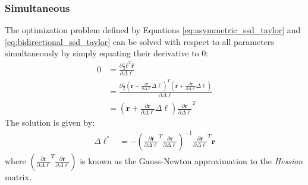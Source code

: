 \subsubsection*{Simultaneous}
\label{sec:gauss_newton_simultaneous}

The optimization problem defined by Equations \ref{eq:asymmetric_ssd_taylor}  and \ref{eq:bidirectional_ssd_taylor} can be solved with respect to all parameters simultaneously by simply equating their derivative to $0$:
\begin{equation}
    \begin{aligned}
		0 & = \frac{\partial\frac{1}{2}\hat{\mathbf{r}}^T \hat{\mathbf{r}}}{\partial \Delta \boldsymbol{\ell}}
		\\
		& = \frac{\partial\frac{1}{2}(\mathbf{r} + \frac{\partial \mathbf{r}}{\partial \Delta \boldsymbol{\ell}} \Delta \boldsymbol{\ell})^T(\mathbf{r} + \frac{\partial \mathbf{r}}{\partial \Delta \boldsymbol{\ell}} \Delta \boldsymbol{\ell})}{\partial \Delta \boldsymbol{\ell}}
		\\
		& = \left( \mathbf{r} + \frac{\partial \mathbf{r}}{\partial \Delta \boldsymbol{\ell}} \Delta \boldsymbol{\ell} \right) \frac{\partial \mathbf{r}}{\partial \Delta \boldsymbol{\ell}}^T
    \label{eq:ssd_bc}
    \end{aligned}
\end{equation}
The solution is given by:
\begin{equation}
    \begin{aligned}
		\Delta \boldsymbol{\ell}^* & =  -\left( \frac{\partial \mathbf{r}}{\partial \Delta \boldsymbol{\ell}}^T \frac{\partial \mathbf{r}}{\partial \Delta \boldsymbol{\ell}} \right)^{-1} \frac{\partial \mathbf{r}}{\partial \Delta \boldsymbol{\ell}}^T \mathbf{r}
    \label{eq:sim_solution}
    \end{aligned}
\end{equation}
where $\left( \frac{\partial \mathbf{r}}{\partial \Delta \boldsymbol{\ell}}^T \frac{\partial \mathbf{r}}{\partial \Delta \boldsymbol{\ell}} \right)$ is known as the Gauss-Newton approximation to the \emph{Hessian} matrix.

